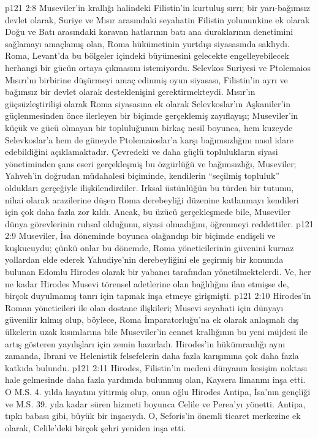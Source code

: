 \vs p121 2:8 Museviler’in krallığı halindeki Filistin’in kurtuluş sırrı; bir yarı\hyp{}bağımsız devlet olarak, Suriye ve Mısır arasındaki seyahatin Filistin yolununkine ek olarak Doğu ve Batı arasındaki karavan hatlarının batı ana duraklarının denetimini sağlamayı amaçlamış olan, Roma hükümetinin yurtdışı siyasasında saklıydı. Roma, Levant’da bu bölgeler içindeki büyümesini gelecekte engelleyebilecek herhangi bir gücün ortaya çıkmasını istemiyordu. Selevkos Suriyesi ve Ptolemaios Mısırı’nı birbirine düşürmeyi amaç edinmiş oyun siyasası, Filistin’in ayrı ve bağımsız bir devlet olarak desteklenişini gerektirmekteydi. Mısır’ın güçsüzleştirilişi olarak Roma siyasasına ek olarak Selevkoslar’ın Aşkaniler’in güçlenmesinden önce ilerleyen bir biçimde gerçeklemiş zayıflayışı; Museviler’in küçük ve gücü olmayan bir topluluğunun birkaç nesil boyunca, hem kuzeyde Selevkoslar’a hem de güneyde Ptolemaioslar'a karşı bağımsızlığını nasıl idare edebildiğini açıklamaktadır. Çevredeki ve daha güçlü toplulukların siyasi yönetiminden şans eseri gerçekleşmiş bu özgürlüğü ve bağımsızlığı, Museviler; Yahveh’in doğrudan müdahalesi biçiminde, kendilerin “seçilmiş topluluk” oldukları gerçeğiyle ilişkilendirdiler. Irksal üstünlüğün bu türden bir tutumu, nihai olarak arazilerine düşen Roma derebeyliği düzenine katlanmayı kendileri için çok daha fazla zor kıldı. Ancak, bu üzücü gerçekleşmede bile, Museviler dünya görevlerinin ruhsal olduğunu, siyasi olmadığını, öğrenmeyi reddettiler.
\vs p121 2:9 Museviler, İsa döneminde boyunca olağandışı bir biçimde endişeli ve kuşkucuydu; çünkü onlar bu dönemde, Roma yöneticilerinin güvenini kurnaz yollardan elde ederek Yahudiye’nin derebeyliğini ele geçirmiş bir konumda bulunan Edomlu Hirodes olarak bir yabancı tarafından yönetilmektelerdi. Ve, her ne kadar Hirodes Musevi törensel adetlerine olan bağlılığını ilan etmişse de, birçok duyulmamış tanrı için tapınak inşa etmeye girişmişti.
\vs p121 2:10 Hirodes’in Roman yöneticileri ile olan dostane ilişkileri; Musevi seyahati için dünyayı güvenilir kılmış olup, böylece, Roma İmparatorluğu’na ek olarak anlaşmalı dış ülkelerin uzak kısımlarına bile Museviler’in cennet krallığının bu yeni müjdesi ile artış gösteren yayılışları için zemin hazırladı. Hirodes’in hükümranlığı aynı zamanda, İbrani ve Helenistik felsefelerin daha fazla karışımına çok daha fazla katkıda bulundu.
\vs p121 2:11 Hirodes, Filistin’in medeni dünyanın kesişim noktası hale gelmesinde daha fazla yardımda bulunmuş olan, Kaysera limanını inşa etti. O M.S. 4. yılda hayatını yitirmiş olup, onun oğlu Hirodes Antipa, İsa’nın gençliği ve M.S. 39. yıla kadar süren hizmeti boyunca Celile ve Perea’yı yönetti. Antipa, tıpkı babası gibi, büyük bir inşacıydı. O, Seforis’in önemli ticaret merkezine ek olarak, Celile’deki birçok şehri yeniden inşa etti.
